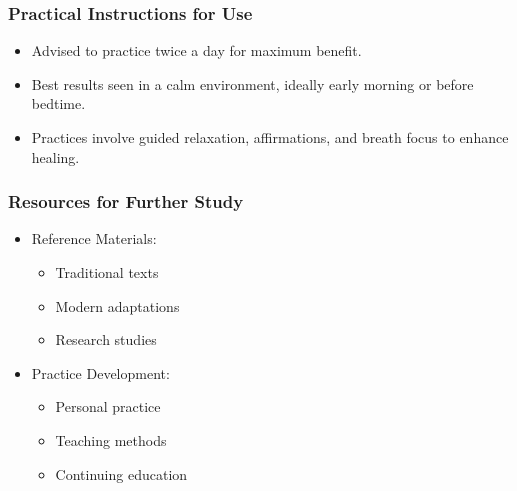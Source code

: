 \begin{frame}[fragile]\frametitle{Practical Instructions for Use}
    \begin{itemize}
        \item Advised to practice twice a day for maximum benefit.
        \item Best results seen in a calm environment, ideally early morning or before bedtime.
        \item Practices involve guided relaxation, affirmations, and breath focus to enhance healing.
    \end{itemize}
\end{frame}



\begin{frame}[fragile]\frametitle{Resources for Further Study}
    \begin{itemize}
        \item Reference Materials:
            \begin{itemize}
                \item Traditional texts
                \item Modern adaptations
                \item Research studies
            \end{itemize}
        \item Practice Development:
            \begin{itemize}
                \item Personal practice
                \item Teaching methods
                \item Continuing education
            \end{itemize}
    \end{itemize}
\end{frame}